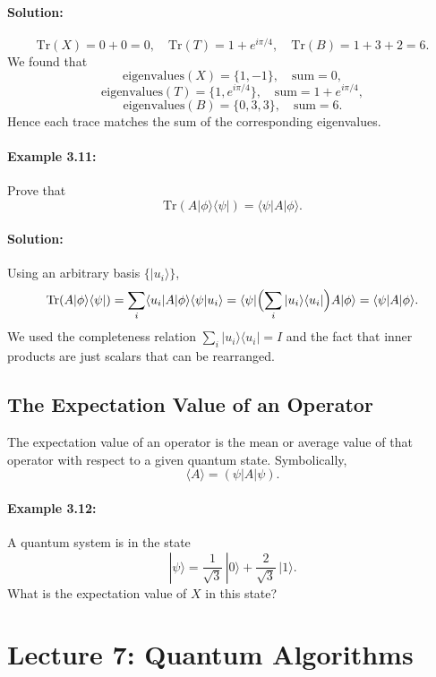 \documentclass{article}
\begin{document}
\paragraph{Solution:}
\[
\mathrm{Tr}(X) = 0 + 0 = 0,
\quad
\mathrm{Tr}(T) = 1 + e^{i\pi/4},
\quad
\mathrm{Tr}(B) = 1 + 3 + 2 = 6.
\]
We found that
\[
\text{eigenvalues}(X) = \{1, -1\}, \quad 
\text{sum} = 0,
\]
\[
\text{eigenvalues}(T) = \{1, e^{i\pi/4}\}, \quad 
\text{sum} = 1 + e^{i\pi/4},
\]
\[
\text{eigenvalues}(B) = \{0, 3, 3\}, 
\quad
\text{sum} = 6.
\]
Hence each trace matches the sum of the corresponding eigenvalues.

\paragraph{Example 3.11:}
Prove that
\[
\mathrm{Tr}(A|\phi\rangle\langle\psi|) = \langle\psi|A|\phi\rangle.
\]

\paragraph{Solution:}
Using an arbitrary basis \(\{|u_i\rangle\}\),
\[
\mathrm{Tr}(A|\phi\rangle\langle\psi|)
= \sum_i \langle u_i|A|\phi\rangle \langle\psi|u_i\rangle
= \langle\psi|\Bigl(\sum_i |u_i\rangle\langle u_i|\Bigr)A|\phi\rangle
= \langle\psi|A|\phi\rangle.
\]
We used the completeness relation \(\sum_i |u_i\rangle\langle u_i| = I\) and the fact that inner products are just scalars that can be rearranged.

\subsection{The Expectation Value of an Operator}

The expectation value of an operator is the mean or average value of that operator with respect to a given quantum state. Symbolically,
\[
\langle A \rangle = (\psi|A|\psi).
\tag{3.39}
\]

\paragraph{Example 3.12:}
A quantum system is in the state
\[
|\psi\rangle = \frac{1}{\sqrt{3}}\,|0\rangle + \frac{2}{\sqrt{3}}\,|1\rangle.
\]
What is the expectation value of \(X\) in this state?

\bigskip

\newpage
\section{Lecture 7: Quantum Algorithms}
\end{document}
